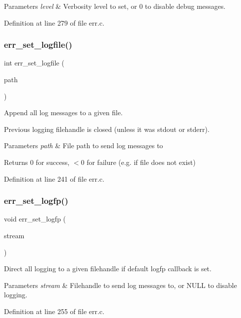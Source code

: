 \begin{DoxyParams}{Parameters}
{\em level} & Verbosity level to set, or 0 to disable debug messages. \\
\hline
\end{DoxyParams}


Definition at line 279 of file err.\+c.

\mbox{\label{err_8c_ad6ec7800ca74f21b9f8f69fcc765f30b}} 
\subsubsection{err\+\_\+set\+\_\+logfile()}
{\footnotesize\ttfamily int err\+\_\+set\+\_\+logfile (\begin{DoxyParamCaption}\item[{const char $\ast$}]{path }\end{DoxyParamCaption})}



Append all log messages to a given file. 

Previous logging filehandle is closed (unless it was stdout or stderr).


\begin{DoxyParams}{Parameters}
{\em path} & File path to send log messages to \\
\hline
\end{DoxyParams}
\begin{DoxyReturn}{Returns}
0 for success, $<$0 for failure (e.\+g. if file does not exist) 
\end{DoxyReturn}


Definition at line 241 of file err.\+c.

\mbox{\label{err_8c_a1ed9de93e9eab18d18be6290b0b187e7}} 
\subsubsection{err\+\_\+set\+\_\+logfp()}
{\footnotesize\ttfamily void err\+\_\+set\+\_\+logfp (\begin{DoxyParamCaption}\item[{F\+I\+LE $\ast$}]{stream }\end{DoxyParamCaption})}



Direct all logging to a given filehandle if default logfp callback is set. 


\begin{DoxyParams}{Parameters}
{\em stream} & Filehandle to send log messages to, or N\+U\+LL to disable logging. \\
\hline
\end{DoxyParams}


Definition at line 255 of file err.\+c.


